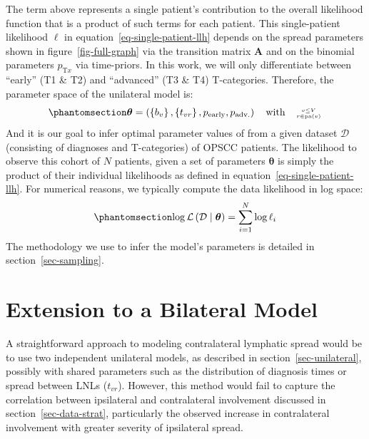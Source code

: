 \documentclass[
  sn-mathphys-num,
]{sn-jnl}
\begin{document}
The term above represents a single patient's contribution to the overall
likelihood function that is a product of such terms for each patient.
This single-patient likelihood \(\ell\) in
equation~\ref{eq-single-patient-llh} depends on the spread parameters
shown in figure~\ref{fig-full-graph} via the transition matrix
\(\mathbf{A}\) and on the binomial parameters \(p_{\text{T}x}\) via
time-priors. In this work, we will only differentiate between ``early''
(T1 \& T2) and ``advanced'' (T3 \& T4) T-categories. Therefore, the
parameter space of the unilateral model is:
%
\begin{equation}\phantomsection\label{eq-param-space}{
\boldsymbol{\theta} = \left( \left\{ b_v \right\}, \left\{ t_{vr} \right\}, p_\text{early}, p_\text{adv.} \right) \quad \text{with} \quad \genfrac{}{}{0pt}{2}{v\leq V}{r\in\operatorname{pa}(v)}
}\end{equation}
%
And it is our goal to infer optimal parameter values of from a given
dataset \(\mathcal{D}\) (consisting of diagnoses and T-categories) of
OPSCC patients. The likelihood to observe this cohort of \(N\) patients,
given a set of parameters \(\boldsymbol{\theta}\) is simply the product
of their individual likelihoods as defined in
equation~\ref{eq-single-patient-llh}. For numerical reasons, we
typically compute the data likelihood in log space:
%
\begin{equation}\phantomsection\label{eq-log-likelihood}{
\log \mathcal{L} \left( \mathcal{D} \mid \boldsymbol{\theta} \right) = \sum_{i=1}^N \log \ell_i
}\end{equation}
%
The methodology we use to infer the model's parameters is detailed in
section~\ref{sec-sampling}.

\section{Extension to a Bilateral Model}\label{sec-ext-to-contra}

A straightforward approach to modeling contralateral lymphatic spread
would be to use two independent unilateral models, as described in
section~\ref{sec-unilateral}, possibly with shared parameters such as
the distribution of diagnosis times or spread between LNLs (\(t_{vr}\)).
However, this method would fail to capture the correlation between
ipsilateral and contralateral involvement discussed in
section~\ref{sec-data-strat}, particularly the observed increase in
contralateral involvement with greater severity of ipsilateral spread.
\end{document}
